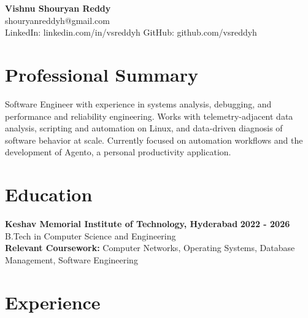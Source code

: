 \documentclass[a4paper,11pt]{article}
\newcommand{\resumeSubheading}[4]{%
  \textbf{#1} \hfill \textbf{#2} \\
{#3} \hfill {#4}
}
\begin{document}
\pagestyle{empty}
\raggedbottom
\addtolength{\textheight}{2\baselineskip}
\small

\begin{center}
  {\LARGE \textbf{Vishnu Shouryan Reddy}}\\[0.3em]
  shouryanreddyh@gmail.com \\[0.3em]
  LinkedIn: linkedin.com/in/vsreddyh \textbar{} GitHub: github.com/vsreddyh
\end{center}
\vspace{-0.8em}

\section*{Professional Summary}

Software Engineer with experience in systems analysis, debugging, and performance and reliability engineering. Works with telemetry-adjacent data analysis, scripting and automation on Linux, and data-driven diagnosis of software behavior at scale. Currently focused on automation workflows and the development of Agento, a personal productivity application.

\section*{Education}

\resumeSubheading
{Keshav Memorial Institute of Technology, Hyderabad}{2022 - 2026}
{B.Tech in Computer Science and Engineering}{} \\
\textbf{Relevant Coursework:} Computer Networks, Operating Systems, Database Management, Software Engineering


\section*{Experience}
\end{document}
